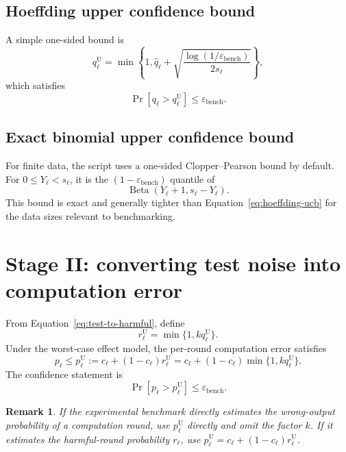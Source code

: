 \documentclass[11pt]{article}
\newtheorem{remark}{Remark}
\newcommand{\eps}{\varepsilon}
\newcommand{\Prob}{\Pr}
\begin{document}
\subsection{Hoeffding upper confidence bound}

A simple one-sided bound is
\begin{equation}
  q_\ell^{\mathrm U}
  =\min\left\{1,
    \widehat q_\ell+
    \sqrt{\frac{\log(1/\eps_{\mathrm{bench}})}{2s_\ell}}
  \right\},
  \label{eq:hoeffding-ucb}
\end{equation}
which satisfies
\begin{equation}
  \Prob\!\left[q_\ell>q_\ell^{\mathrm U}\right]
  \le \eps_{\mathrm{bench}}.
\end{equation}

\subsection{Exact binomial upper confidence bound}

For finite data, the script uses a one-sided Clopper--Pearson bound by default.
For $0\le Y_\ell<s_\ell$, it is the $(1-\eps_{\mathrm{bench}})$ quantile of
\begin{equation}
  \operatorname{Beta}(Y_\ell+1,s_\ell-Y_\ell).
\end{equation}
This bound is exact and generally tighter than Equation~\eqref{eq:hoeffding-ucb}
for the data sizes relevant to benchmarking.

\section{Stage II: converting test noise into computation error}

From Equation~\eqref{eq:test-to-harmful}, define
\begin{equation}
  r_\ell^{\mathrm U}=\min\{1,kq_\ell^{\mathrm U}\}.
\end{equation}
Under the worst-case effect model, the per-round computation error satisfies
\begin{equation}
  p_\ell
  \le p_\ell^{\mathrm U}
  :=c_\ell+(1-c_\ell)r_\ell^{\mathrm U}
  =c_\ell+(1-c_\ell)\min\{1,kq_\ell^{\mathrm U}\}.
  \label{eq:p-upper}
\end{equation}
The confidence statement is
\begin{equation}
  \Prob\!\left[p_\ell>p_\ell^{\mathrm U}\right]
  \le\eps_{\mathrm{bench}}.
\end{equation}

\begin{remark}
If the experimental benchmark directly estimates the wrong-output probability
of a computation round, use $p_\ell^{\mathrm U}$ directly and omit the factor
$k$. If it estimates the harmful-round probability $r_\ell$, use
$p_\ell^{\mathrm U}=c_\ell+(1-c_\ell)r_\ell^{\mathrm U}$.
\end{remark}
\end{document}
